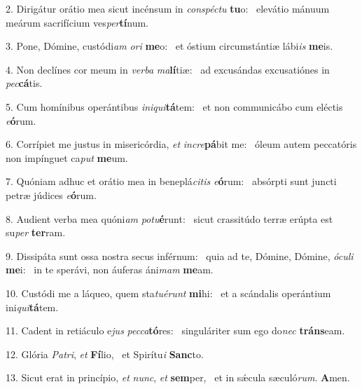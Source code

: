 2. Dirigátur orátio mea sicut incénsum in \textit{con}\textit{spéc}\textit{tu} \textbf{tu}o: \ast\  elevátio mánuum meárum sacrifícium ves\textit{per}\textbf{tí}num.\

3. Pone, Dómine, custódi\textit{am} \textit{o}\textit{ri} \textbf{me}o: \ast\  et óstium circumstántiæ lábi\textit{is} \textbf{me}is.\

4. Non declínes cor meum in \textit{ver}\textit{ba} \textit{ma}\textbf{lí}tiæ: \ast\  ad excusándas excusatiónes in \textit{pec}\textbf{cá}tis.\

5. Cum homínibus operántibus \textit{in}\textit{i}\textit{qui}\textbf{tá}tem: \ast\  et non communicábo cum eléctis \textit{e}\textbf{ó}rum.\

6. Corrípiet me justus in misericórdia, \textit{et} \textit{in}\textit{cre}\textbf{pá}bit me: \ast\  óleum autem peccatóris non impínguet ca\textit{put} \textbf{me}um.\

7. Quóniam adhuc et orátio mea in beneplá\textit{ci}\textit{tis} \textit{e}\textbf{ó}rum: \ast\  absórpti sunt juncti petræ júdices \textit{e}\textbf{ó}rum.\

8. Audient verba mea quóni\textit{am} \textit{pot}\textit{u}\textbf{é}runt: \ast\  sicut crassitúdo terræ erúpta est su\textit{per} \textbf{ter}ram.\

9. Dissipáta sunt ossa nostra secus inférnum: \dag\  quia ad te, Dómine, Dómine, \textit{ó}\textit{cu}\textit{li} \textbf{me}i: \ast\  in te sperávi, non áuferas áni\textit{mam} \textbf{me}am.\

10. Custódi me a láqueo, quem sta\textit{tu}\textit{é}\textit{runt} \textbf{mi}hi: \ast\  et a scándalis operántium ini\textit{qui}\textbf{tá}tem.\

11. Cadent in retiáculo e\textit{jus} \textit{pec}\textit{ca}\textbf{tó}res: \ast\  singuláriter sum ego do\textit{nec} \textbf{tráns}eam.\

12. Glória \textit{Pa}\textit{tri}, \textit{et} \textbf{Fí}lio, \ast\  et Spirítu\textit{i} \textbf{Sanc}to.\

13. Sicut erat in princípio, \textit{et} \textit{nunc}, \textit{et} \textbf{sem}per, \ast\  et in sǽcula sæculó\textit{rum}. \textbf{A}men.\

